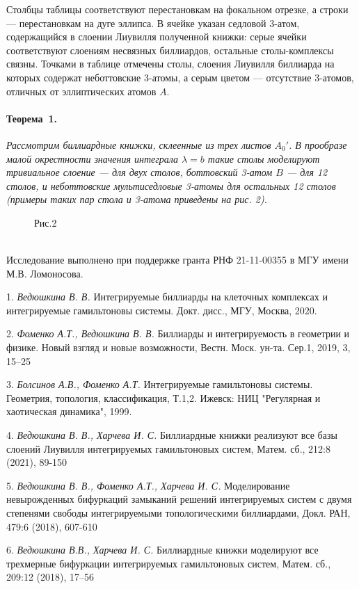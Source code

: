 \documentclass{vzmsthesis}
\begin{document}
Столбцы таблицы соответствуют перестановкам на фокальном отрезке, а строки --- перестановкам на дуге эллипса. В ячейке указан седловой 3-атом, содержащийся в слоении Лиувилля полученной книжки: серые ячейки соответствуют слоениям несвязных биллиардов, остальные столы-комплексы связны. Точками в таблице отмечены столы, слоения Лиувилля биллиарда на которых содержат неботтовские 3-атомы, а серым цветом --- отсутствие 3-атомов, отличных от эллиптических атомов $A$.\\

 \vspace*{-0.6cm} 
\paragraph{Теорема~1.}
{\it
	Рассмотрим биллиардные книжки, склеенные из трех листов $A_0'$. В прообразе малой окрестности значения интеграла $\lambda=b$ такие столы моделируют тривиальное слоение — для двух столов, боттовский 3-атом $B$ — для 12 столов, и неботтовские мультиседловые 3-атомы для остальных 12 столов (примеры таких пар стола и 3-атома приведены на рис. 2).
}
\vspace*{-0.5cm} 
\begin{figure}[h!]
\begin{minipage}[h!]{0.49\linewidth}
\end{minipage}
\begin{minipage}[h!]{0.49\linewidth}
\end{minipage}
\begin{center}
Рис.2
\end{center}
\end{figure}\\

\vspace*{-0.8cm} 
Исследование выполнено при поддержке гранта РНФ 21-11-00355 в МГУ имени М.В. Ломоносова.
 
\litlist


1. {\it Ведюшкина В. В.}
 Интегрируемые биллиарды на клеточных комплексах и интегрируемые гамильтоновы системы. Докт. дисс., МГУ, Москва, 2020.
 
2. {\it Фоменко А.Т., Ведюшкина В. В.}
 Биллиарды и интегрируемость в геометрии и физике. Новый взгляд и новые возможности, Вестн. Моск. ун-та. Сер.1, 2019, 3, 15–25
 
3.  {\it Болсинов А.В., Фоменко А.Т.}
 Интегрируемые гамильтоновы системы. Геометрия, топология, классификация, Т.1,2. Ижевск: НИЦ "Регулярная и хаотическая динамика", 1999.
 
4. {\it Ведюшкина В. В., Харчева И. С.}
 Биллиардные книжки реализуют все базы слоений Лиувилля интегрируемых гамильтоновых систем, Матем. сб., 212:8 (2021),  89-150
 
5. {\it Ведюшкина В. В., Фоменко А.Т., Харчева И. С.}
 Моделирование невырожденных бифуркаций замыканий решений интегрируемых систем с двумя степенями свободы интегрируемыми топологическими биллиардами, Докл. РАН, 479:6 (2018), 607-610
 
 6. {\it Ведюшкина В.В., Харчева И. С.}
 Биллиардные книжки моделируют все трехмерные бифуркации интегрируемых гамильтоновых систем, Матем. сб., 209:12 (2018), 17–56
\end{document}
